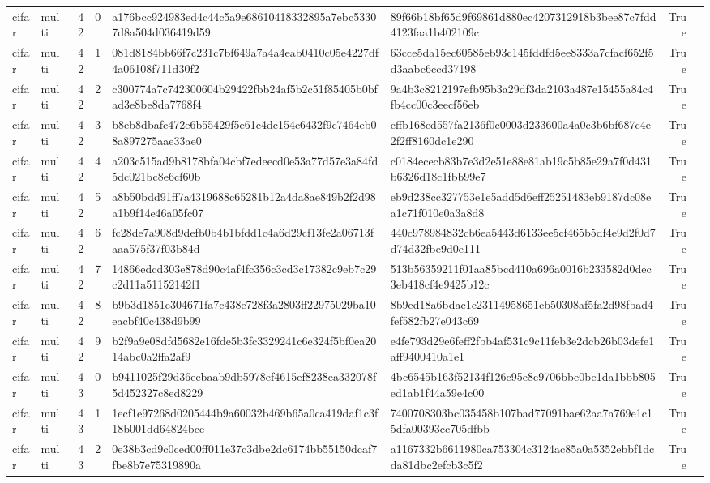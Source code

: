 \begin{tabular}{llrrllrl}
cifar & multi & 42 & 0 & a176bcc924983ed4c44c5a9e68610418332895a7ebc53307d8a504d036419d59 & 89f66b18bf65d9f69861d880ec4207312918b3bee87c7fdd4123faa1b402109c & True &  \\
cifar & multi & 42 & 1 & 081d8184bb66f7c231c7bf649a7a4a4eab0410c05e4227df4a06108f711d30f2 & 63cce5da15ec60585eb93c145fddfd5ee8333a7cfacf652f5d3aabc6ccd37198 & True &  \\
cifar & multi & 42 & 2 & c300774a7c742300604b29422fbb24af5b2c51f85405b0bfad3e8be8da7768f4 & 9a4b3c8212197efb95b3a29df3da2103a487e15455a84c4fb4cc00c3eecf56eb & True &  \\
cifar & multi & 42 & 3 & b8eb8dbafc472e6b55429f5e61c4dc154c6432f9c7464eb08a897275aae33ae0 & cffb168ed557fa2136f0c0003d233600a4a0c3b6bf687c4e2f2ff8160dc1e290 & True &  \\
cifar & multi & 42 & 4 & a203c515ad9b8178bfa04cbf7edeecd0e53a77d57e3a84fd5dc021bc8e6cf60b & c0184ececb83b7e3d2e51e88e81ab19c5b85e29a7f0d431b6326d18c1fbb99e7 & True &  \\
cifar & multi & 42 & 5 & a8b50bdd91ff7a4319688c65281b12a4da8ae849b2f2d98a1b9f14e46a05fc07 & eb9d238cc327753e1e5add5d6eff25251483eb9187dc08ea1c71f010e0a3a8d8 & True &  \\
cifar & multi & 42 & 6 & fc28de7a908d9defb0b4b1bfdd1c4a6d29cf13fe2a06713faaa575f37f03b84d & 440c978984832cb6ea5443d6133ee5cf465b5df4e9d2f0d7d74d32fbe9d0e111 & True &  \\
cifar & multi & 42 & 7 & 14866edcd303e878d90c4af4fc356c3cd3c17382c9eb7c29c2d11a51152142f1 & 513b56359211f01aa85bcd410a696a0016b233582d0dec3eb418cf4e9425b12c & True &  \\
cifar & multi & 42 & 8 & b9b3d1851e304671fa7c438e728f3a2803ff22975029ba10eacbf40c438d9b99 & 8b9ed18a6bdac1c23114958651cb50308af5fa2d98fbad4fef582fb27e043c69 & True &  \\
cifar & multi & 42 & 9 & b2f9a9e08dfd5682e16fde5b3fc3329241c6e324f5bf0ea2014abc0a2ffa2af9 & e4fe793d29e6feff2fbb4af531c9c11feb3e2dcb26b03defe1aff9400410a1e1 & True &  \\
cifar & multi & 43 & 0 & b9411025f29d36eebaab9db5978ef4615ef8238ea332078f5d452327c8ed8229 & 4bc6545b163f52134f126c95e8e9706bbe0be1da1bbb805ed1ab1f44a59e4c00 & True &  \\
cifar & multi & 43 & 1 & 1ecf1e97268d0205444b9a60032b469b65a0ca419daf1c3f18b001dd64824bce & 7400708303bc035458b107bad77091bae62aa7a769e1c15dfa00393cc705dfbb & True &  \\
cifar & multi & 43 & 2 & 0e38b3cd9c0ced00ff011e37c3dbe2dc6174bb55150dcaf7fbe8b7e75319890a & a1167332b6611980ca753304c3124ac85a0a5352ebbf1dcda81dbc2efcb3c5f2 & True &  \\

\end{tabular}
